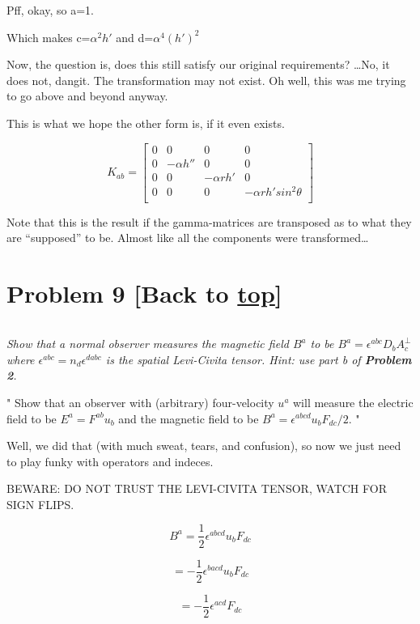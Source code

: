 \documentclass[landscape,letterpaper,10pt,english]{article}
\begin{document}
    

    Pff, okay, so a=1.

Which makes c=\(\alpha^2 h'\) and d=\(\alpha^4 (h')^2\)

Now, the question is, does this still satisfy our original requirements?
\ldots No, it does not, dangit. The transformation may not exist. Oh
well, this was me trying to go above and beyond anyway.

    This is what we hope the other form is, if it even exists.

\[ K_{ab} = \begin{bmatrix}
0 & 0 & 0 & 0 \\
0 & -\alpha h'' & 0 & 0 \\
0 & 0 & -\alpha rh' & 0 \\
0 & 0 & 0 & -\alpha rh' sin^2\theta \\
\end{bmatrix}\]

Note that this is the result if the gamma-matrices are transposed as to
what they are ``supposed'' to be. Almost like all the components were
transformed\ldots{}

    \hypertarget{problem-9-back-to-top}{%
\section{\texorpdfstring{Problem 9 {[}Back to
\hyperref[toc]{top}{]}}{Problem 9 {[}Back to {]}}}\label{problem-9-back-to-top}}

\[\label{P9}\]

\emph{Show that a normal observer measures the magnetic field \(B^a\) to
be \(B^a = \epsilon^{abc} D_b A^\perp_c\) where
\(\epsilon^{abc} = n_d\epsilon^{dabc}\) is the spatial Levi-Civita
tensor. Hint: use part b of \textbf{Problem 2}.}

    " Show that an observer with (arbitrary) four-velocity \(u^a\) will
measure the electric field to be \(E^a = F^{ab}u_b\) and the magnetic
field to be \(B^a = \epsilon^{abcd}u_b F_{dc}/2\). "

    Well, we did that (with much sweat, tears, and confusion), so now we
just need to play funky with operators and indeces.

BEWARE: DO NOT TRUST THE LEVI-CIVITA TENSOR, WATCH FOR SIGN FLIPS.

\[ B^a = \frac12 \epsilon^{abcd} u_b F_{dc}  \]

\[ = -\frac12 \epsilon^{bacd} u_b F_{dc} \]

\[ = -\frac12 \epsilon^{acd} F_{dc} \]
\end{document}
